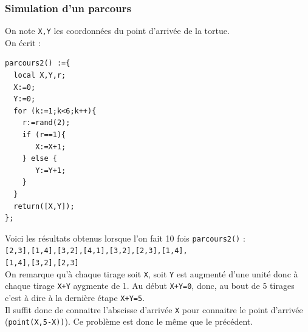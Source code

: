 \documentclass[a4paper,11pt]{book}
\begin{document}
\subsubsection{Simulation d'un parcours}
On note {\tt X,Y} les coordonn\'ees du point d'arriv\'ee de la tortue.\\
On \'ecrit :
\begin{verbatim}
parcours2() :={
  local X,Y,r;
  X:=0;
  Y:=0;
  for (k:=1;k<6;k++){
    r:=rand(2);
    if (r==1){
       X:=X+1;
    } else {
       Y:=Y+1;
    }
  }
  return([X,Y]);
}; 
\end{verbatim} 
Voici les r\'esultats obtenus lorsque l'on fait 10 fois {\tt parcours2()} :\\
{\tt [2,3],[1,4],[3,2],[4,1],[3,2],[2,3],[1,4],}\\
{\tt [1,4],[3,2],[2,3]}\\
On remarque qu'\`a chaque tirage soit {\tt X}, soit {\tt Y} est augment\'e 
d'une unit\'e donc \`a chaque tirage {\tt X+Y} aygmente de 1. Au d\'ebut 
{\tt X+Y=0}, donc, 
au bout de 5 tirages c'est \`a dire \`a la derni\`ere \'etape {\tt X+Y=5}.\\
Il suffit donc de connaitre l'abscisse d'arriv\'ee {\tt X} pour connaitre le 
point d'arriv\'ee ({\tt point(X,5-X))}). Ce probl\`eme est donc le m\^eme que 
le pr\'ec\'edent.
\end{document}
